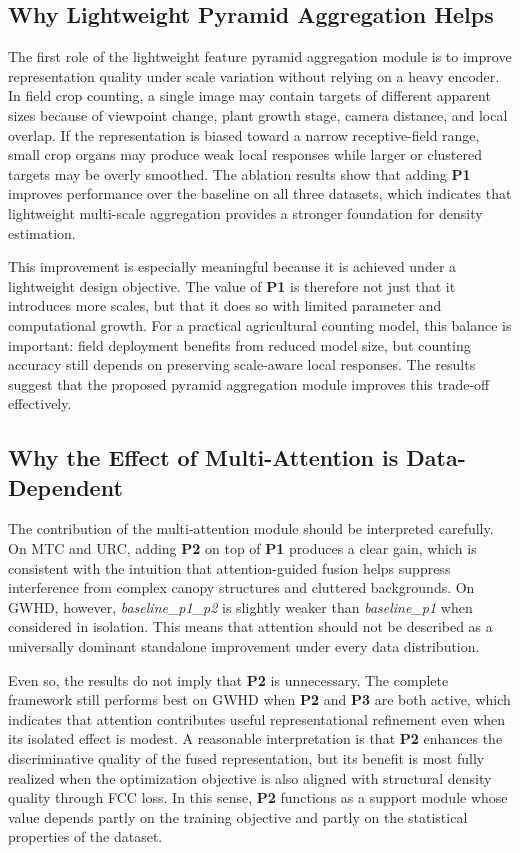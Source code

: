 \documentclass[a4paper,fleqn]{cas-sc}
\begin{document}
\subsection{Why Lightweight Pyramid Aggregation Helps}

The first role of the lightweight feature pyramid aggregation module is to improve representation quality under scale variation without relying on a heavy encoder. In field crop counting, a single image may contain targets of different apparent sizes because of viewpoint change, plant growth stage, camera distance, and local overlap. If the representation is biased toward a narrow receptive-field range, small crop organs may produce weak local responses while larger or clustered targets may be overly smoothed. The ablation results show that adding \textbf{P1} improves performance over the baseline on all three datasets, which indicates that lightweight multi-scale aggregation provides a stronger foundation for density estimation.

This improvement is especially meaningful because it is achieved under a lightweight design objective. The value of \textbf{P1} is therefore not just that it introduces more scales, but that it does so with limited parameter and computational growth. For a practical agricultural counting model, this balance is important: field deployment benefits from reduced model size, but counting accuracy still depends on preserving scale-aware local responses. The results suggest that the proposed pyramid aggregation module improves this trade-off effectively.

\subsection{Why the Effect of Multi-Attention is Data-Dependent}

The contribution of the multi-attention module should be interpreted carefully. On MTC and URC, adding \textbf{P2} on top of \textbf{P1} produces a clear gain, which is consistent with the intuition that attention-guided fusion helps suppress interference from complex canopy structures and cluttered backgrounds. On GWHD, however, \textit{baseline\_p1\_p2} is slightly weaker than \textit{baseline\_p1} when considered in isolation. This means that attention should not be described as a universally dominant standalone improvement under every data distribution.

Even so, the results do not imply that \textbf{P2} is unnecessary. The complete framework still performs best on GWHD when \textbf{P2} and \textbf{P3} are both active, which indicates that attention contributes useful representational refinement even when its isolated effect is modest. A reasonable interpretation is that \textbf{P2} enhances the discriminative quality of the fused representation, but its benefit is most fully realized when the optimization objective is also aligned with structural density quality through FCC loss. In this sense, \textbf{P2} functions as a support module whose value depends partly on the training objective and partly on the statistical properties of the dataset.
\end{document}
